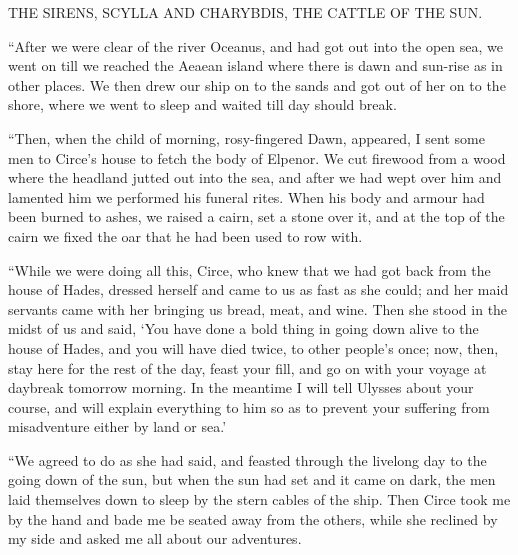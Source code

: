 
THE SIRENS, SCYLLA AND CHARYBDIS, THE CATTLE OF THE SUN.

“After we were clear of the river Oceanus, and had got out into the open sea,
we went on till we reached the Aeaean island where there is dawn and sun-rise
as in other places. We then drew our ship on to the sands and got out of her on
to the shore, where we went to sleep and waited till day should break.

“Then, when the child of morning, rosy-fingered Dawn, appeared, I sent some men
to Circe’s house to fetch the body of Elpenor. We cut firewood from a wood
where the headland jutted out into the sea, and after we had wept over him and
lamented him we performed his funeral rites. When his body and armour had been
burned to ashes, we raised a cairn, set a stone over it, and at the top of the
cairn we fixed the oar that he had been used to row with.

“While we were doing all this, Circe, who knew that we had got back from the
house of Hades, dressed herself and came to us as fast as she could; and her
maid servants came with her bringing us bread, meat, and wine. Then she stood
in the midst of us and said, ‘You have done a bold thing in going down alive to
the house of Hades, and you will have died twice, to other people’s once; now,
then, stay here for the rest of the day, feast your fill, and go on with your
voyage at daybreak tomorrow morning. In the meantime I will tell Ulysses about
your course, and will explain everything to him so as to prevent your suffering
from misadventure either by land or sea.’

“We agreed to do as she had said, and feasted through the livelong day to the
going down of the sun, but when the sun had set and it came on dark, the men
laid themselves down to sleep by the stern cables of the ship. Then Circe took
me by the hand and bade me be seated away from the others, while she reclined
by my side and asked me all about our adventures.

